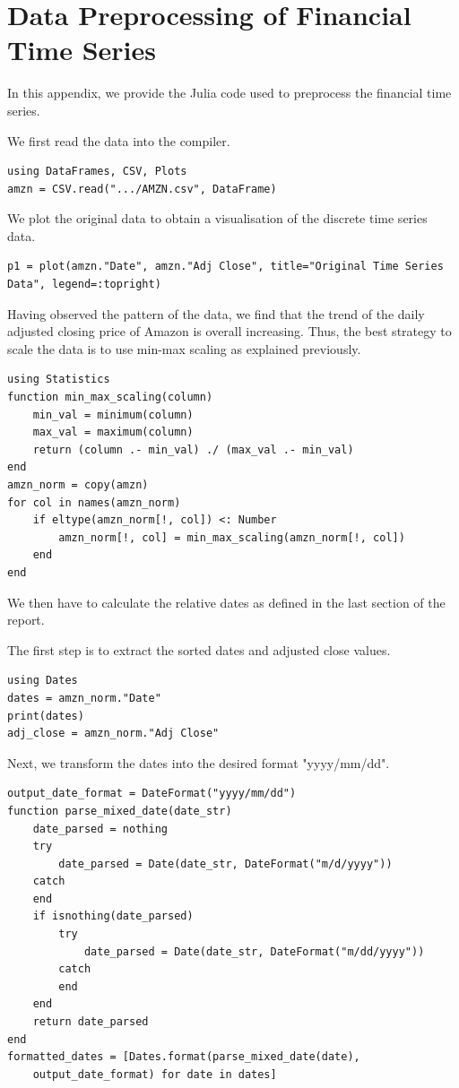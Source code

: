 \documentclass[a4paper,11pt,titlepage]{article}
\theoremstyle{definition}
\theoremstyle{plain}
\theoremstyle{remark}
\begin{document}
\pagebreak
\section{Data Preprocessing of Financial Time Series}
\label{sec:datatime}

In this appendix, we provide the Julia code used to preprocess the financial time series.

We first read the data into the compiler.
\begin{verbatim}
using DataFrames, CSV, Plots
amzn = CSV.read(".../AMZN.csv", DataFrame)
\end{verbatim}

We plot the original data to obtain a visualisation of the discrete time series data.
\begin{verbatim}
p1 = plot(amzn."Date", amzn."Adj Close", title="Original Time Series
Data", legend=:topright)
\end{verbatim}

Having observed the pattern of the data, we find that the trend of the daily adjusted closing price of Amazon is overall increasing. Thus, the best strategy to scale the data is to use min-max scaling as explained previously.
\begin{verbatim}
using Statistics
function min_max_scaling(column)
    min_val = minimum(column)
    max_val = maximum(column)
    return (column .- min_val) ./ (max_val .- min_val)
end
amzn_norm = copy(amzn)
for col in names(amzn_norm)
    if eltype(amzn_norm[!, col]) <: Number
        amzn_norm[!, col] = min_max_scaling(amzn_norm[!, col])
    end
end
\end{verbatim}

We then have to calculate the relative dates as defined in the last section of the report.

The first step is to extract the sorted dates and adjusted close values. 
\begin{verbatim}
using Dates
dates = amzn_norm."Date"
print(dates)
adj_close = amzn_norm."Adj Close"
\end{verbatim}

Next, we transform the dates into the desired format "yyyy/mm/dd".
\begin{verbatim}
output_date_format = DateFormat("yyyy/mm/dd")
function parse_mixed_date(date_str)
    date_parsed = nothing
    try
        date_parsed = Date(date_str, DateFormat("m/d/yyyy"))
    catch
    end
    if isnothing(date_parsed)
        try
            date_parsed = Date(date_str, DateFormat("m/dd/yyyy"))
        catch
        end
    end
    return date_parsed
end
formatted_dates = [Dates.format(parse_mixed_date(date), 
    output_date_format) for date in dates]
\end{verbatim}
\end{document}
